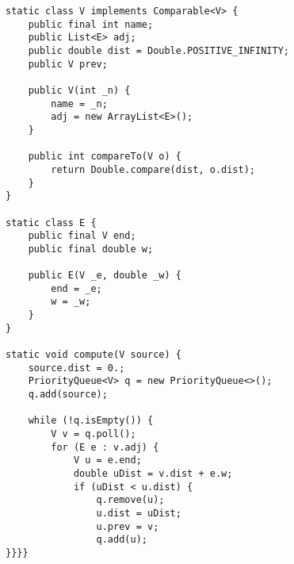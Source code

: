 \begin{verbatim}
static class V implements Comparable<V> {
	public final int name;
	public List<E> adj;
	public double dist = Double.POSITIVE_INFINITY;
	public V prev;

	public V(int _n) {
		name = _n;
		adj = new ArrayList<E>();
	}

	public int compareTo(V o) {
		return Double.compare(dist, o.dist);
	}
}

static class E {
	public final V end;
	public final double w;

	public E(V _e, double _w) {
		end = _e;
		w = _w;
	}
}
	
static void compute(V source) {
	source.dist = 0.;
	PriorityQueue<V> q = new PriorityQueue<>();
	q.add(source);

	while (!q.isEmpty()) {
		V v = q.poll();
		for (E e : v.adj) {
			V u = e.end;
			double uDist = v.dist + e.w;
			if (uDist < u.dist) {
				q.remove(u);
				u.dist = uDist;
				u.prev = v;
				q.add(u);
}}}}
\end{verbatim}